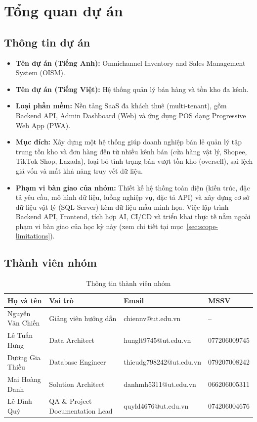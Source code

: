 \section{Tổng quan dự án}
\subsection{Thông tin dự án}
\begin{itemize}
    \item \textbf{Tên dự án (Tiếng Anh):} Omnichannel Inventory and Sales Management System (OISM).
    \item \textbf{Tên dự án (Tiếng Việt):} Hệ thống quản lý bán hàng và tồn kho đa kênh.
    \item \textbf{Loại phần mềm:} Nền tảng SaaS đa khách thuê (multi-tenant), gồm Backend API, Admin Dashboard (Web) và ứng dụng POS dạng Progressive Web App (PWA).
    \item \textbf{Mục đích:} Xây dựng một hệ thống giúp doanh nghiệp bán lẻ quản lý tập trung tồn kho và đơn hàng đến từ nhiều kênh bán (cửa hàng vật lý, Shopee, TikTok Shop, Lazada), loại bỏ tình trạng bán vượt tồn kho (oversell), sai lệch giá vốn và mất khả năng truy vết dữ liệu.
    \item \textbf{Phạm vi bàn giao của nhóm:} Thiết kế hệ thống toàn diện (kiến trúc, đặc tả yêu cầu, mô hình dữ liệu, luồng nghiệp vụ, đặc tả API) và xây dựng cơ sở dữ liệu vật lý (SQL Server) kèm dữ liệu mẫu minh họa. Việc lập trình Backend API, Frontend, tích hợp AI, CI/CD và triển khai thực tế nằm ngoài phạm vi bàn giao của học kỳ này (xem chi tiết tại mục~\ref{sec:scope-limitations}).
\end{itemize}

\subsection{Thành viên nhóm}
\begin{table}[htbp]
    \centering
    \small
    \caption{Thông tin thành viên nhóm}
    \begin{tabular}{|p{3.4cm}|p{3.6cm}|p{4.6cm}|p{2.4cm}|}
        \hline
        \textbf{Họ và tên} & \textbf{Vai trò} & \textbf{Email} & \textbf{MSSV} \\
        \hline
        Nguyễn Văn Chiến & Giảng viên hướng dẫn & chiennv@ut.edu.vn & -- \\
        \hline
        Lê Tuấn Hưng & Data Architect & hunglt9745@ut.edu.vn & 077206009745 \\
        \hline
        Dương Gia Thiều & Database Engineer & thieudg798242@ut.edu.vn & 079207008242 \\
        \hline
        Mai Hoàng Danh & Solution Architect & danhmh5311@ut.edu.vn & 066206005311 \\
        \hline
        Lê Đình Quý & QA \& Project Documentation Lead & quyld4676@ut.edu.vn & 074206004676 \\
        \hline
    \end{tabular}
\end{table}
